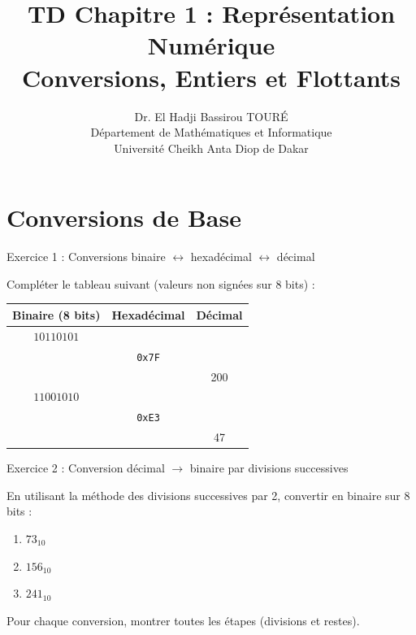 \documentclass[10pt,a4paper]{article}
\title{\textbf{TD Chapitre 1 : Représentation Numérique}\\
\large Conversions, Entiers et Flottants}
\author{Dr. El Hadji Bassirou TOURÉ\\
Département de Mathématiques et Informatique\\
Université Cheikh Anta Diop de Dakar}
\date{}
\begin{document}
\maketitle

\section{Conversions de Base}

\begin{exercicebox}{Exercice 1 : Conversions binaire $\leftrightarrow$ hexadécimal $\leftrightarrow$ décimal}

Compléter le tableau suivant (valeurs non signées sur 8 bits) :

\begin{center}
\begin{tabular}{|c|c|c|}
\hline
\textbf{Binaire (8 bits)} & \textbf{Hexadécimal} & \textbf{Décimal} \\
\hline
$10110101$ & & \\
\hline
& \texttt{0x7F} & \\
\hline
& & 200 \\
\hline
$11001010$ & & \\
\hline
& \texttt{0xE3} & \\
\hline
& & 47 \\
\hline
\end{tabular}
\end{center}
\end{exercicebox}

\begin{exercicebox}{Exercice 2 : Conversion décimal $\rightarrow$ binaire par divisions successives}

En utilisant la méthode des divisions successives par 2, convertir en binaire sur 8 bits :

\begin{enumerate}[label=\alph*)]
    \item $73_{10}$
    \item $156_{10}$
    \item $241_{10}$
\end{enumerate}

Pour chaque conversion, montrer toutes les étapes (divisions et restes).
\end{exercicebox}
\end{document}
